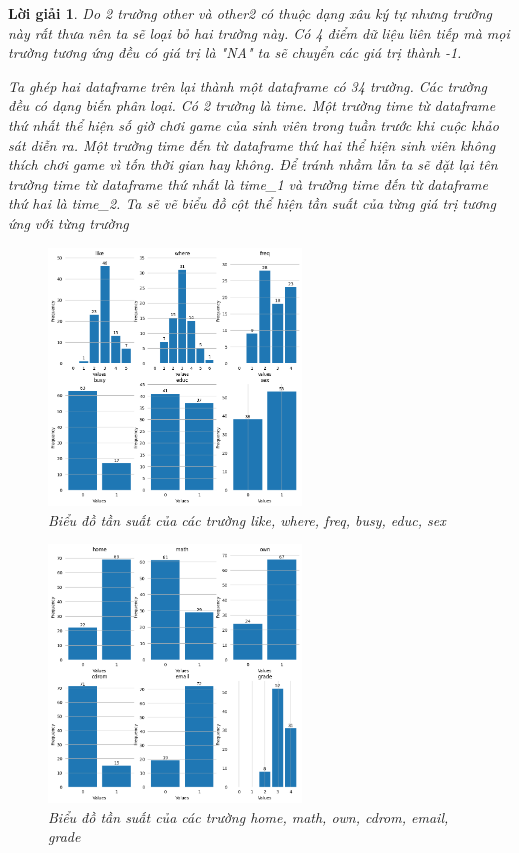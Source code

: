 \documentclass[14pt, a4paper]{article}
\theoremstyle{sltheorem}
\theoremstyle{soltheorem}
\newtheorem*{loigiai}{Lời giải}
\begin{document}
\begin{loigiai}
    Do 2 trường other và other2 có thuộc dạng xâu ký tự nhưng trường này rất thưa nên ta sẽ loại bỏ hai trường này.
    Có 4 điểm dữ liệu liên tiếp mà mọi trường tương ứng đều có giá trị là "NA" ta sẽ chuyển các giá trị thành -1.

    Ta ghép hai dataframe trên lại thành một dataframe có 34 trường.
    Các trường đều có dạng biến phân loại.
    Có 2 trường là time.
    Một trường time từ dataframe thứ nhất thể hiện số giờ chơi game của sinh viên trong tuần trước khi cuộc khảo sát diễn ra.
    Một trường time đến từ dataframe thứ hai thể hiện sinh viên không thích chơi game vì tốn thời gian hay không.
    Để tránh nhầm lẫn ta sẽ đặt lại tên trường time từ dataframe thứ nhất là time\_1 và trường time đến từ dataframe thứ hai là time\_2.
    Ta sẽ vẽ biểu đồ cột thể hiện tần suất của từng giá trị tương ứng với từng trường
    \begin{figure}[h!]
        \centering
        \includegraphics[width=0.6\textwidth]{1.png}
        \caption{Biểu đồ tần suất của các trường like, where, freq, busy, educ, sex}
        \label{fig:1}
    \end{figure}

    \begin{figure}[h!]
        \centering
        \includegraphics[width=0.6\textwidth]{2.png}
        \caption{Biểu đồ tần suất của các trường home, math, own, cdrom, email, grade}
        \label{fig:2}
    \end{figure}


\end{loigiai}
\end{document}
